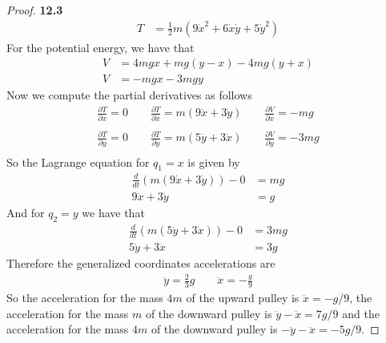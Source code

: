 \documentclass[11pt]{article}
\theoremstyle{definition}
\begin{document}
\begin{proof}{\textbf{12.3}}
\begin{align*}
        T &= \frac{1}{2}m(9\dot{x}^2 + 6\dot{x}\dot{y} + 5 \dot{y}^2)
    \end{align*}
    For the potential energy, we have that
    \begin{align*}
        V &= 4mgx + mg(y-x) - 4mg(y+x)\\
        V &= -mgx -3mgy
    \end{align*}
    Now we compute the partial derivatives as follows
    \begin{align*}
        \frac{\partial T}{\partial x} = 0\quad\quad
        \frac{\partial T}{\partial \dot x} = m(9\dot{x} + 3\dot{y})\quad\quad
        \frac{\partial V}{\partial x} = -mg\\\\
        \frac{\partial T}{\partial y} = 0\quad\quad
        \frac{\partial T}{\partial \dot y} = m(5\dot{y} + 3\dot{x})\quad\quad
        \frac{\partial V}{\partial y} = -3mg\\
    \end{align*}
    So the Lagrange equation for $q_1 = x$ is given by
    \begin{align*}
        \frac{d}{dt}(m(9\dot{x} + 3\dot{y})) - 0 &= mg\\
        9\ddot{x} + 3\ddot{y} &= g
    \end{align*}
    And for $q_2 = y$ we have that
    \begin{align*}
        \frac{d}{dt}(m(5\dot{y} + 3\dot{x})) - 0 &= 3mg\\
        5\ddot{y} + 3\ddot{x} &= 3g
    \end{align*}
    Therefore the generalized coordinates accelerations are
    \begin{align*}
        \ddot{y} = \frac{2}{3}g\quad\quad
        \ddot{x} = -\frac{g}{9}
    \end{align*}
    So the acceleration for the mass $4m$ of the upward pulley is
    $\ddot{x} = -g/9$, the acceleration for the mass $m$ of the downward pulley
    is $\ddot{y} - \ddot{x} = 7g/9$ and the acceleration for the mass $4m$
    of the downward pulley is $-\ddot{y} - \ddot{x} = -5g/9$.
\end{proof}
\cleardoublepage
\end{document}

